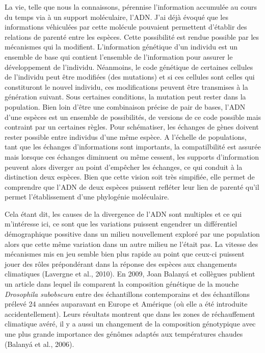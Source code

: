 La vie, telle que nous la connaissons, pérennise l'information accumulée
au cours du temps via à un support moléculaire, l'ADN. J'ai déjà évoqué
que les informations véhiculées par cette molécule pouvaient permettent
d'établir des relations de parenté entre les espèces. Cette possibilité
est rendue possible par les mécanismes qui la modifient. L'information
génétique d'un individu est un ensemble de base qui contient l'ensemble
de l'information pour assurer le développement de l'individu. Néanmoins,
le code génétique de certaines cellules de l'individu peut être
modifiées (des mutations) et si ces cellules sont celles qui
constituront le nouvel individu, ces modifications peuvent être
transmises à la génération suivant. Sous certaines conditions, la
mutation peut rester dans la population. Bien loin d'être une
combinaison précise de pair de bases, l'ADN d'une espèces est un
ensemble de possibilités, de versions de ce code possible mais contraint
par un certaines règles. Pour schématiser, les échanges de gènes doivent
rester possible entre individus d'une même espèce. A l'échelle de
populations, tant que les échanges d'informations sont importants, la
compatilbilité est assurée mais lorsque ces échanges diminuent ou même
cessent, les supports d'information peuvent alors diverger au point
d'empêcher les échanges, ce qui conduit à la distinction deux espèces.
Bien que cette vision soit très simpifiée, elle permet de comprendre que
l'ADN de deux espèces puissent refléter leur lien de parenté qu'il
permet l'établissement d'une phylogénie moléculaire.

Cela étant dit, les causes de la divergence de l'ADN sont multiples et
ce qui m'intéresse ici, ce sont que les variations puissent engendrer un
différentiel démographique possitive dans un milieu nouvellement exploré
par une population alors que cette même variation dans un autre milieu
ne l'était pas. La vitesse des mécanismes mis en jeu semble bien plus
rapide au point que ceux-ci puissent jouer des rôles prépondérant dans
la réponse des espèces aux changements climatiques (Lavergne et al.,
2010). En 2009, Joan Balanyá et collègues publient un article dans
lequel ils comparent la composition génétique de la mouche
\emph{Drosophila subobscura} entre des échantillons contemporains et des
échantillons prélevé 24 années auparavant en Europe et Amérique (où elle
a été introduite accidentellement). Leurs résultats montrent que dans
les zones de réchauffement climatique avéré, il y a aussi un changement
de la composition génotypique avec une plus grande importance des
génômes adaptés aux températures chaudes (Balanyá et al., 2006).

